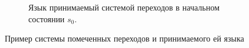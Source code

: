 \begin{figure}[t]
\begin{subfigure}[t]{0.48\textwidth}
    \label{fig:lang-ex}
    \caption{Язык принимаемый системой переходов в начальном состоянии $s_0$.}
  \end{subfigure}

  




  \label{fig:lts-lang-ex}
  \caption{
    Пример системы помеченных переходов и принимаемого ей языка
  }
\end{figure}
